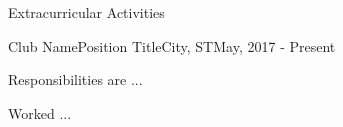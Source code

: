 \begin{resume_section}{Extracurricular Activities}
  \begin{resume_employer}{Club Name}{Position Title}{City, ST}{May, 2017 - Present}
    \item Responsibilities are ...
    \item Worked ...
  \end{resume_employer}
\end{resume_section}